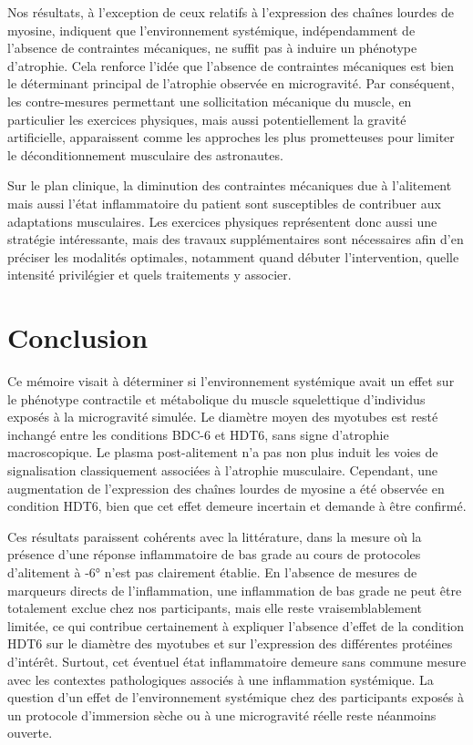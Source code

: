 \documentclass[11pt]{report}
\begin{document}
Nos résultats, à l'exception de ceux relatifs à l'expression des chaînes lourdes de myosine, indiquent que l'environnement systémique, indépendamment de l'absence de contraintes mécaniques, ne suffit pas à induire un phénotype d'atrophie. Cela renforce l'idée que l'absence de contraintes mécaniques est bien le déterminant principal de l'atrophie observée en microgravité. Par conséquent, les contre-mesures permettant une sollicitation mécanique du muscle, en particulier les exercices physiques, mais aussi potentiellement la gravité artificielle, apparaissent comme les approches les plus prometteuses pour limiter le déconditionnement musculaire des astronautes.

Sur le plan clinique, la diminution des contraintes mécaniques due à l'alitement mais aussi l'état inflammatoire du patient sont susceptibles de contribuer aux adaptations musculaires. Les exercices physiques représentent donc aussi une stratégie intéressante, mais des travaux supplémentaires sont nécessaires afin d'en préciser les modalités optimales, notamment quand débuter l'intervention, quelle intensité privilégier et quels traitements y associer.

\chapter{Conclusion}

Ce mémoire visait à déterminer si l'environnement systémique avait un effet sur le phénotype contractile et métabolique du muscle squelettique d'individus exposés à la microgravité simulée. Le diamètre moyen des myotubes est resté inchangé entre les conditions BDC-6 et HDT6, sans signe d'atrophie macroscopique. Le plasma post-alitement n'a pas non plus induit les voies de signalisation classiquement associées à l'atrophie musculaire. Cependant, une augmentation de l'expression des chaînes lourdes de myosine a été observée en condition HDT6, bien que cet effet demeure incertain et demande à être confirmé.

Ces résultats paraissent cohérents avec la littérature, dans la mesure où la présence d'une réponse inflammatoire de bas grade au cours de protocoles d'alitement à -6° n'est pas clairement établie. En l'absence de mesures de marqueurs directs de l'inflammation, une inflammation de bas grade ne peut être totalement exclue chez nos participants, mais elle reste vraisemblablement limitée, ce qui contribue certainement à expliquer l'absence d'effet de la condition HDT6 sur le diamètre des myotubes et sur l'expression des différentes protéines d'intérêt. Surtout, cet éventuel état inflammatoire demeure sans commune mesure avec les contextes pathologiques associés à une inflammation systémique. La question d'un effet de l'environnement systémique chez des participants exposés à un protocole d'immersion sèche ou à une microgravité réelle reste néanmoins ouverte.
\end{document}
